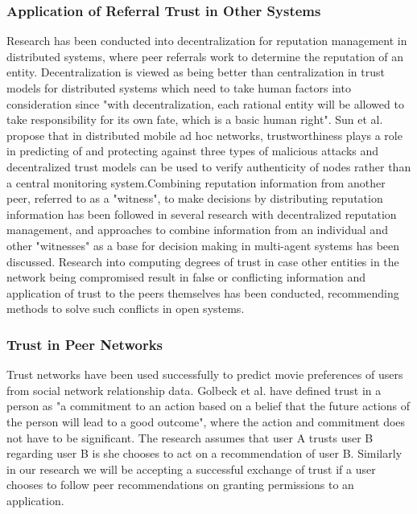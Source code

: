 \subsubsection{Application of Referral Trust in Other Systems}
Research has been conducted into decentralization for reputation management in distributed systems, where peer referrals work to determine the reputation of an entity. Decentralization is viewed as being better than centralization in trust models for distributed systems which need to take human factors into consideration since "with decentralization, each rational entity will be allowed to take responsibility for its own fate, which is a basic human right"\cite{abdul1997using}. Sun et al. propose that in distributed mobile ad hoc networks, trustworthiness plays a role in predicting of and protecting against three types of malicious attacks and decentralized trust models can be used to verify authenticity of nodes rather than a central monitoring system\cite{sun2008defense}.Combining reputation information from another peer, referred to as a "witness"\cite{yu2000social}\cite{yu2002evidential}, to make decisions by distributing reputation information has been followed in several research with decentralized reputation management, and approaches to combine information from an individual and other "witnesses" as a base for decision making in multi-agent systems has been discussed\cite{sabater2002reputation}. Research into computing degrees of trust in case other entities in the network being compromised result in false or conflicting information and application of trust to the peers themselves has been conducted, recommending methods to solve such conflicts in open systems\cite{beth1994valuation}.

\subsubsection{Trust in Peer Networks}
Trust networks have been used successfully to predict movie preferences of users from social network relationship data\cite{golbeck2006generating}. Golbeck et al. have defined trust in a person as "a commitment to an action based on a belief that the future actions of the person will lead to a good outcome", where the action and commitment does not have to be significant. The research assumes that user A trusts user B regarding user B is she chooses to act on a recommendation of user B. Similarly in our research we will be accepting a successful exchange of trust if a user chooses to follow peer recommendations on granting permissions to an application. 
\smallskip

